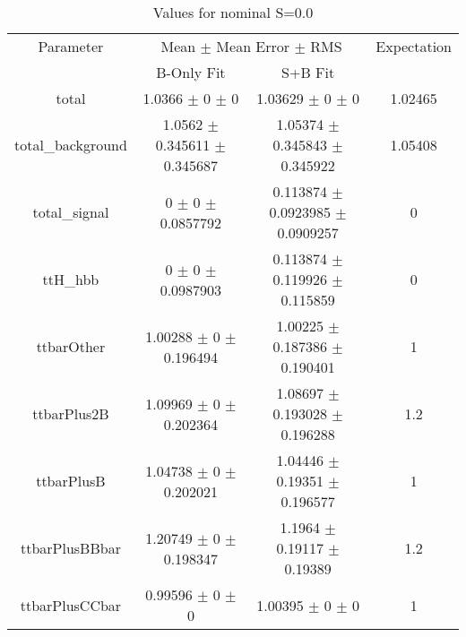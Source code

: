 \begin{table}
\centering
\caption{Values for nominal S=0.0}
\begin{tabular}{cccc}
\toprule
Parameter & \multicolumn{2}{c}{Mean $\pm$ Mean Error $\pm$ RMS} & Expectation\\
 & B-Only Fit & S+B Fit & \\
\midrule
total & \num{1.0366} $\pm$ \num{0} $\pm$ \num{0} & \num{1.03629} $\pm$ \num{0} $\pm$ \num{0} & \num{1.02465}\\
total\_background & \num{1.0562} $\pm$ \num{0.345611} $\pm$ \num{0.345687} & \num{1.05374} $\pm$ \num{0.345843} $\pm$ \num{0.345922} & \num{1.05408}\\
total\_signal & \num{0} $\pm$ \num{0} $\pm$ \num{0.0857792} & \num{0.113874} $\pm$ \num{0.0923985} $\pm$ \num{0.0909257} & \num{0}\\
ttH\_hbb & \num{0} $\pm$ \num{0} $\pm$ \num{0.0987903} & \num{0.113874} $\pm$ \num{0.119926} $\pm$ \num{0.115859} & \num{0}\\
ttbarOther & \num{1.00288} $\pm$ \num{0} $\pm$ \num{0.196494} & \num{1.00225} $\pm$ \num{0.187386} $\pm$ \num{0.190401} & \num{1}\\
ttbarPlus2B & \num{1.09969} $\pm$ \num{0} $\pm$ \num{0.202364} & \num{1.08697} $\pm$ \num{0.193028} $\pm$ \num{0.196288} & \num{1.2}\\
ttbarPlusB & \num{1.04738} $\pm$ \num{0} $\pm$ \num{0.202021} & \num{1.04446} $\pm$ \num{0.19351} $\pm$ \num{0.196577} & \num{1}\\
ttbarPlusBBbar & \num{1.20749} $\pm$ \num{0} $\pm$ \num{0.198347} & \num{1.1964} $\pm$ \num{0.19117} $\pm$ \num{0.19389} & \num{1.2}\\
ttbarPlusCCbar & \num{0.99596} $\pm$ \num{0} $\pm$ \num{0} & \num{1.00395} $\pm$ \num{0} $\pm$ \num{0} & \num{1}\\
\bottomrule
\end{tabular}
\end{table}